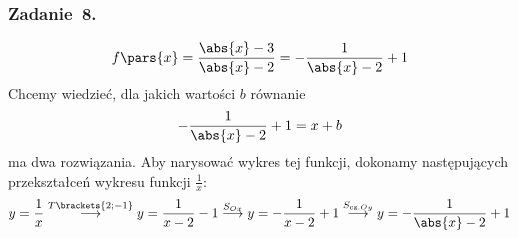 \subsubsection*{Zadanie~8.}
\begin{equation*}
    f\pars{x}
        = \frac{\abs{x} - 3}{\abs{x} - 2}
        = -\frac{1}{\abs{x} - 2} + 1
\end{equation*}
Chcemy wiedzieć, dla jakich wartości \(b\) równanie
\begin{equation*}
    -\frac{1}{\abs{x} - 2} + 1 = x + b
\end{equation*}
ma dwa rozwiązania.
Aby narysować wykres tej funkcji, dokonamy następujących przekształceń wykresu funkcji \(\frac{1}{x}\):
\begin{equation*}
    y = \frac{1}{x}
    \overset{T\brackets{2; -1}}{\longrightarrow}
    y = \frac{1}{x - 2} - 1
    \overset{S_{Ox}}{\longrightarrow}
    y = -\frac{1}{x - 2} + 1
    \overset{S_{\textrm{cz.}Oy}}{\longrightarrow}
    y = -\frac{1}{\abs{x} - 2} + 1
\end{equation*}
